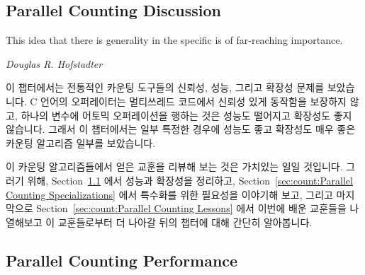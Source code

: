 \begin{lineref}
\section{Parallel Counting Discussion}
\label{sec:count:Parallel Counting Discussion}
%
\epigraph{This idea that there is generality in the specific is of
	  far-reaching importance.}
	 {\emph{Douglas R. Hofstadter}}

이 챕터에서는 전통적인 카운팅 도구들의 신뢰성, 성능, 그리고 확장성 문제를
보았습니다.
C 언어의 \co{++} 오퍼레이터는 멀티쓰레드 코드에서 신뢰성 있게 동작함을 보장하지
않고, 하나의 변수에 어토믹 오퍼레이션을 행하는 것은 성능도 떨어지고 확장성도
좋지 않습니다.
그래서 이 챕터에서는 일부 특정한 경우에 성능도 좋고 확장성도 매우 좋은 카운팅
알고리즘 일부를 보았습니다.

이 카운팅 알고리즘들에서 얻은 교훈을 리뷰해 보는 것은 가치있는 일일 것입니다.
그러기 위해,
Section~\ref{sec:count:Parallel Counting Performance} 에서 성능과 확장성을
정리하고,
Section~\ref{sec:count:Parallel Counting Specializations} 에서 특수화를 위한
필요성을 이야기해 보고,
그리고 마지막으로
Section~\ref{sec:count:Parallel Counting Lessons} 에서 이번에 배운 교훈들을
나열해보고 이 교훈들로부터 더 나아갈 뒤의 챕터에 대해 간단히 알아봅니다.

\subsection{Parallel Counting Performance}
\label{sec:count:Parallel Counting Performance}


\end{lineref}
